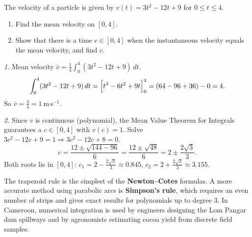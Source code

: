 \documentclass[11pt]{article}
\begin{document}
\begin{exemplebox}
The velocity of a particle is given by $v(t) = 3t^2 - 12t + 9$ for $0 \le t \le 4$. 
\begin{enumerate}
\item Find the mean velocity on $[0,4]$.
\item Show that there is a time $c \in [0,4]$ when the instantaneous velocity equals the mean velocity, and find $c$.
\end{enumerate}
\end{exemplebox}

\begin{exoresolu}[Solution]
\emph{1.} Mean velocity $\bar{v} = \frac{1}{4}\int_0^4 (3t^2-12t+9)\,dt$.
\[
\int_0^4 (3t^2-12t+9)\,dt = \Bigl[ t^3 - 6t^2 + 9t \Bigr]_0^4 = (64 - 96 + 36) - 0 = 4.
\]
So $\bar{v} = \frac{4}{4} = 1\ \mathrm{m\,s^{-1}}$.

\emph{2.} Since $v$ is continuous (polynomial), the Mean Value Theorem for Integrals guarantees a $c \in [0,4]$ with $v(c)=1$.
Solve $3c^2 - 12c + 9 = 1 \Rightarrow 3c^2 - 12c + 8 = 0$.
\[
c = \frac{12 \pm \sqrt{144 - 96}}{6} = \frac{12 \pm \sqrt{48}}{6} = 2 \pm \frac{2\sqrt{3}}{3}.
\]
Both roots lie in $[0,4]$: $c_1 = 2 - \frac{2\sqrt{3}}{3} \approx 0.845$, $c_2 = 2 + \frac{2\sqrt{3}}{3} \approx 3.155$.
\end{exoresolu}

\begin{savaistu}
The trapezoid rule is the simplest of the \textbf{Newton--Cotes} formulas. A more accurate method using parabolic arcs is \textbf{Simpson's rule}, which requires an even number of strips and gives exact results for polynomials up to degree 3. In Cameroon, numerical integration is used by engineers designing the Lom Pangar dam spillways and by agronomists estimating cocoa yield from discrete field samples.
\end{savaistu}
\end{document}
